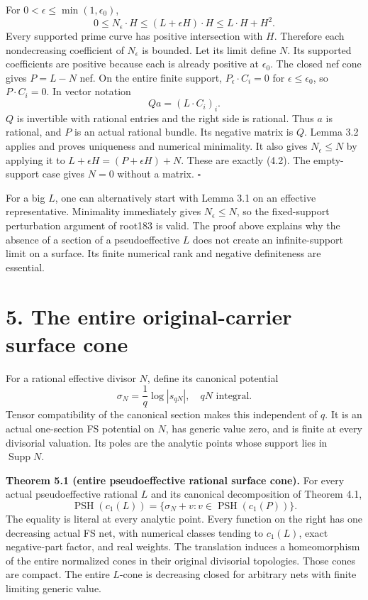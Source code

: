 \documentclass[
  10pt,
]{article}
\begin{document}
For \(0<\epsilon\leq\min(1,\epsilon_0)\), \[
 0\leq N_\epsilon\cdot H
       \leq (L+\epsilon H)\cdot H\leq L\cdot H+H^2.
\] Every supported prime curve has positive intersection with \(H\).
Therefore each nondecreasing coefficient of \(N_\epsilon\) is bounded.
Let its limit define \(N\). Its supported coefficients are positive
because each is already positive at \(\epsilon_0\). The closed nef cone
gives \(P=L-N\) nef. On the entire finite support,
\(P_\epsilon\cdot C_i=0\) for \(\epsilon\leq\epsilon_0\), so
\(P\cdot C_i=0\). In vector notation \[
 Q a=(L\cdot C_i)_i.
\] \(Q\) is invertible with rational entries and the right side is
rational. Thus \(a\) is rational, and \(P\) is an actual rational
bundle. Its negative matrix is \(Q\). Lemma 3.2 applies and proves
uniqueness and numerical minimality. It also gives \(N_\epsilon\leq N\)
by applying it to \(L+\epsilon H=(P+\epsilon H)+N\). These are exactly
(4.2). The empty-support case gives \(N=0\) without a matrix.
\(\square\)

For a big \(L\), one can alternatively start with Lemma 3.1 on an
effective representative. Minimality immediately gives
\(N_\epsilon\leq N\), so the fixed-support perturbation argument of
root183 is valid. The proof above explains why the absence of a section
of a pseudoeffective \(L\) does not create an infinite-support limit on
a surface. Its finite numerical rank and negative definiteness are
essential.

\section{5. The entire original-carrier surface
cone}\label{the-entire-original-carrier-surface-cone}

For a rational effective divisor \(N\), define its canonical potential
\[
 \sigma_N=\frac1q\log|s_{qN}|,
                   \quad qN\text{ integral}.                    \tag{5.1}
\] Tensor compatibility of the canonical section makes this independent
of \(q\). It is an actual one-section FS potential on \(N\), has generic
value zero, and is finite at every divisorial valuation. Its poles are
the analytic points whose support lies in \(\operatorname{Supp}N\).

\textbf{Theorem 5.1 (entire pseudoeffective rational surface cone).} For
every actual pseudoeffective rational \(L\) and its canonical
decomposition of Theorem 4.1, \[
 \operatorname{PSH}(c_1(L))
       =\{\sigma_N+v:v\in\operatorname{PSH}(c_1(P))\}.           \tag{5.2}
\] The equality is literal at every analytic point. Every function on
the right has one decreasing actual FS net, with numerical classes
tending to \(c_1(L)\), exact negative-part factor, and real weights. The
translation induces a homeomorphism of the entire normalized cones in
their original divisorial topologies. Those cones are compact. The
entire \(L\)-cone is decreasing closed for arbitrary nets with finite
limiting generic value.
\end{document}
